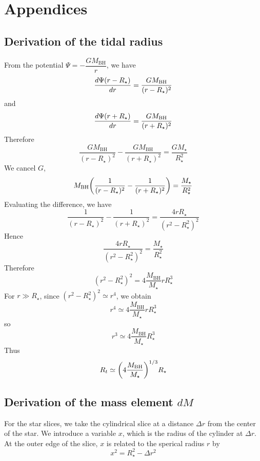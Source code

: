 \documentclass[10pt,a4paper]{article}
\newcommand{\mbh}{M_\text{BH}}
\begin{document}
	\newpage
	\section*{Appendices}
		\subsection*{Derivation of the tidal radius}
			From the potential $\Psi = -\dfrac{G\mbh}{r}$, we have
			\[
				\dv{\Psi(r-R_\star)}{r} = 
				\frac{G\mbh}{(r-R_\star)^2}  
			\]
			and
			\[
				\dv{\Psi(r+R_\star)}{r} = 
				\frac{G\mbh}{(r+R_\star)^2}  
			\]
			Therefore
			\[
				\frac{G\mbh}{(r-R_\star)^2}  
				-
				\frac{G\mbh}{(r+R_\star)^2}  
				=
				\frac{GM_\star}{R_\star^2} 
			\]
			We cancel $G$,
			\[
				\mbh \pqty{
				\frac{1}{(r-R_\star)^2}  
				-
				\frac{1}{(r+R_\star)^2}  
				}
				= 
				\frac{M_\star}{R_\star^2} 
			\]
			Evaluating the difference, we have
			\[
				\frac{1}{(r-R_\star)^2}
				-
				\frac{1}{(r+R_\star)^2}
				=
				\frac{4rR_\star}{(r^2 - R_\star^2)^2} 
			\]
			Hence
			\[
				\frac{4rR_\star}{(r^2 - R_\star^2)^2} 
				=
				\frac{M_\star}{R_\star^2} 
			\]
			Therefore
			\[
				(r^2-R_\star^2)^2 = 
				4 \frac{\mbh}{M_\star} r R_\star^3 
			\]
			For $r \gg R_\star$, since $(r^2-R_\star^2)^2 \simeq r^4$, we obtain
			\[
				r^4 \simeq
				4 \frac{\mbh}{M_\star} r R_\star^3 
			\]
			so
			\[
				r^3 \simeq
				4 \frac{\mbh}{M_\star} R_\star^3 
			\]
			Thus
			\[
				R_t \simeq
				\pqty{4 \frac{\mbh}{M_\star}}^{1/3} R_\star 
			\]
		\subsection*{Derivation of the mass element $dM$}
			For the star slices, we take the cylindrical slice at a distance $\Delta r$ from the center of the star. We introduce a variable $x$, which is 
			the radius of the cylinder at $\Delta r$. At the outer edge of the slice, $x$ is related to the sperical radius $r$ by
			\[
				x^2 = R_\star^2 - \Delta r^2
			\]
\end{document}
